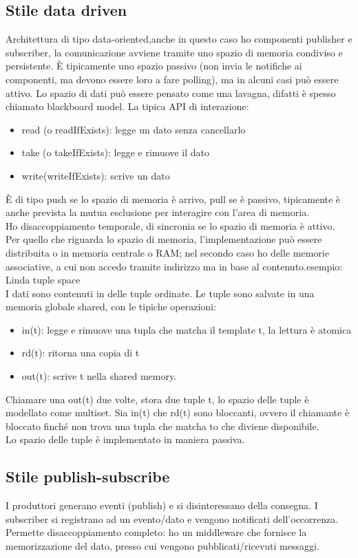 \documentclass[16px]{article}
\begin{document}
\subsection{Stile data driven}
Architettura di tipo data-oriented,anche in questo caso ho componenti publisher e subscriber, la comunicazione avviene tramite uno spazio di memoria condiviso e persistente. È tipicamente uno spazio passivo (non invia le notifiche ai componenti, ma devono essere loro a fare polling), ma in alcuni casi può essere attivo. Lo spazio di dati può essere pensato come una lavagna, difatti è spesso chiamato blackboard model. La tipica API di interazione:
\begin{itemize}
\item read (o readIfExists): legge un dato senza cancellarlo
\item take (o takeIfExists): legge e rimuove il dato
\item write(writeIfExists): scrive un dato  
\end{itemize}
È di tipo push se lo spazio di memoria è arrivo, pull se è passivo, tipicamente è anche prevista la mutua esclusione per interagire con l'area di memoria.\\ Ho disaccoppiamento temporale, di sincronia se lo spazio di memoria è attivo.\\ Per quello che riguarda lo spazio di memoria, l'implementazione può essere distribuita o in memoria centrale o RAM; nel secondo caso ho delle memorie associative, a cui non accedo tramite indirizzo ma in base al contenuto.esempio: Linda tuple space\\
I dati sono contenuti in delle tuple ordinate. Le tuple sono salvate in una memoria globale shared, con le tipiche operazioni:
\begin{itemize}
\item in(t): legge e rimuove una tupla che matcha il template t, la lettura è atomica
\item rd(t): ritorna una copia di t
\item out(t): scrive t nella shared memory.
\end{itemize}
Chiamare una out(t) due volte, stora due tuple t, lo spazio delle tuple è modellato come multiset. Sia in(t) che rd(t) sono bloccanti, ovvero il chiamante è bloccato finché non trova una tupla che matcha to che diviene disponibile.\\ Lo spazio delle tuple è implementato in maniera passiva.
\subsection{Stile publish-subscribe}
I produttori generano eventi (publish) e si disinteressano della consegna. I subscriber si registrano ad un evento/dato e vengono notificati dell'occorrenza.\\ Permette disaccoppiamento completo: ho un middleware che fornisce la memorizzazione del dato, presso cui vengono pubblicati/ricevuti messaggi.
\end{document}

